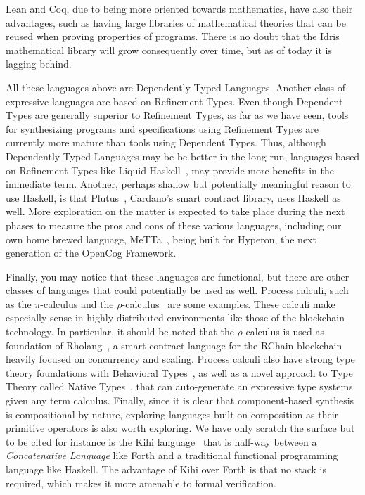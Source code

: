 \documentclass[]{report}
\begin{document}
Lean and Coq, due to being more oriented towards mathematics, have
also their advantages, such as having large libraries of mathematical
theories that can be reused when proving properties of programs.
There is no doubt that the Idris mathematical library will grow
consequently over time, but as of today it is lagging behind.

All these languages above are Dependently Typed Languages.  Another
class of expressive languages are based on Refinement Types.  Even
though Dependent Types are generally superior to Refinement Types, as
far as we have seen, tools for synthesizing programs and
specifications using Refinement Types are currently more mature than
tools using Dependent Types.  Thus, although Dependently Typed
Languages may be be better in the long run, languages based on
Refinement Types like Liquid Haskell~\cite{Vazou2014}, may provide
more benefits in the immediate term.  Another, perhaps shallow but
potentially meaningful reason to use Haskell, is that
Plutus~\cite{Plutus2022}, Cardano's smart contract library, uses
Haskell as well.  More exploration on the matter is expected to take
place during the next phases to measure the pros and cons of these
various languages, including our own home brewed language,
MeTTa~\cite{Warrell2022}, being built for Hyperon, the next generation
of the OpenCog Framework.

Finally, you may notice that these languages are functional, but there
are other classes of languages that could potentially be used as well.
Process calculi, such as the $\pi$-calculus and the
$\rho$-calculus~\cite{Meredith2005} are some examples.  These calculi
make especially sense in highly distributed environments like those of
the blockchain technology.  In particular, it should be noted that the
$\rho$-calculus is used as foundation of Rholang~\cite{Rholang2021}, a
smart contract language for the RChain blockchain~\cite{RChain2021}
heavily focused on concurrency and scaling.  Process calculi also have
strong type theory foundations with Behavioral
Types~\cite{Caires2004}, as well as a novel approach to Type Theory
called Native Types~\cite{Williams2021}, that can auto-generate an
expressive type systems given any term calculus.  Finally, since it is
clear that component-based synthesis is compositional by nature,
exploring languages built on composition as their primitive operators
is also worth exploring.  We have only scratch the surface but to be
cited for instance is the Kihi language~\cite{Timothy2018} that is
half-way between a \emph{Concatenative Language} like Forth and a
traditional functional programming language like Haskell.  The
advantage of Kihi over Forth is that no stack is required, which makes
it more amenable to formal verification.
\end{document}
